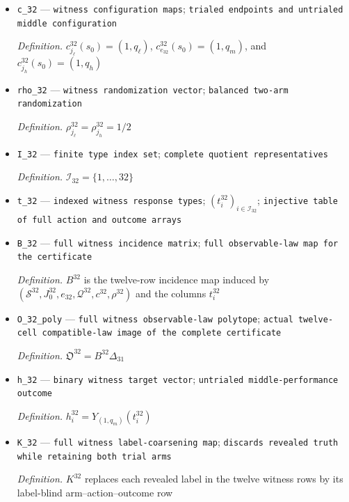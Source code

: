 \documentclass{article}
\begin{document}
\begin{itemize}
  \item \texttt{c\_\allowbreak{}32} --- \texttt{witness configuration maps}; \texttt{trialed endpoints and untrialed middle configuration}
  \par\smallskip\noindent\emph{Definition.} \(c^{32}_{j_{\ell}}(s_0)=(1,q_{\ell})\), \(c^{32}_{e_{32}}(s_0)=(1,q_m)\), and \(c^{32}_{j_h}(s_0)=(1,q_h)\)
  \item \texttt{rho\_\allowbreak{}32} --- \texttt{witness randomization vector}; \texttt{balanced two-\allowbreak{}arm randomization}
  \par\smallskip\noindent\emph{Definition.} \(\rho^{32}_{j_{\ell}}=\rho^{32}_{j_h}=1/2\)
  \item \texttt{I\_\allowbreak{}32} --- \texttt{finite type index set}; \texttt{complete quotient representatives}
  \par\smallskip\noindent\emph{Definition.} \(\mathcal I_{32}=\{1,\ldots,32\}\)
  \item \texttt{t\_\allowbreak{}32} --- \texttt{indexed witness response types}; \((t^{32}_i)_{i\in\mathcal I_{32}}\); \texttt{injective table of full action and outcome arrays}
  \item \texttt{B\_\allowbreak{}32} --- \texttt{full witness incidence matrix}; \texttt{full observable-\allowbreak{}law map for the certificate}
  \par\smallskip\noindent\emph{Definition.} \(B^{32}\) is the twelve-row incidence map induced by \((\mathcal S^{32},J^{32}_0,e_{32},\mathcal Q^{32},c^{32},\rho^{32})\) and the columns \(t^{32}_i\)
  \item \texttt{O\_\allowbreak{}32\_\allowbreak{}poly} --- \texttt{full witness observable-\allowbreak{}law polytope}; \texttt{actual twelve-\allowbreak{}cell compatible-\allowbreak{}law image of the complete certificate}
  \par\smallskip\noindent\emph{Definition.} \(\mathfrak O^{32}=B^{32}\Delta_{31}\)
  \item \texttt{h\_\allowbreak{}32} --- \texttt{binary witness target vector}; \texttt{untrialed middle-\allowbreak{}performance outcome}
  \par\smallskip\noindent\emph{Definition.} \(h^{32}_i=Y_{(1,q_m)}(t^{32}_i)\)
  \item \texttt{K\_\allowbreak{}32} --- \texttt{full witness label-\allowbreak{}coarsening map}; \texttt{discards revealed truth while retaining both trial arms}
  \par\smallskip\noindent\emph{Definition.} \(K^{32}\) replaces each revealed label in the twelve witness rows by its label-blind arm--action--outcome row

\end{itemize}
\end{document}
